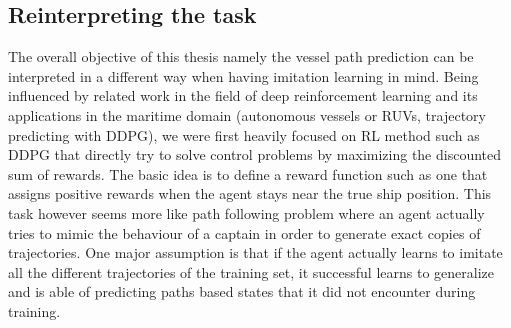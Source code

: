 \subsection{Reinterpreting the task}
The overall objective of this thesis namely the vessel path prediction can be interpreted in a different way when having imitation learning in mind. Being influenced by related work in the field of deep reinforcement learning and its applications in the maritime domain (autonomous vessels or RUVs, trajectory predicting with DDPG), we were first heavily focused on RL method such as DDPG that directly try to solve control problems by maximizing the discounted sum of rewards. The basic idea is to define a reward function such as one that assigns positive rewards when the agent stays near the true ship position. This task however seems more like path following problem where an agent actually tries to mimic the behaviour of a captain in order to generate exact copies of trajectories. One major assumption is that if the agent actually learns to imitate all the different trajectories of the training set, it successful learns to generalize and is able of predicting paths based states that it did not encounter during training.